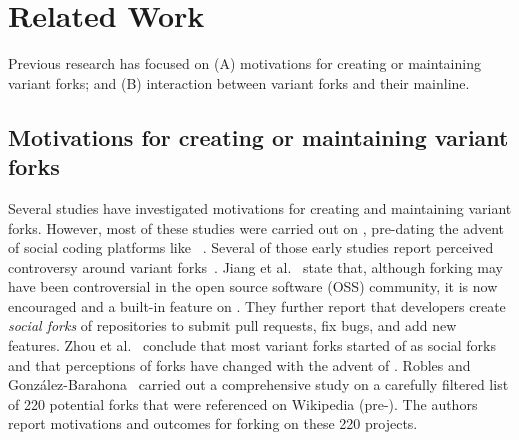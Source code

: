 
\section{Related Work}
\label{sec:background}
Previous research has focused on (A) motivations for creating or maintaining variant forks; and (B) interaction between variant forks and their mainline.%



\subsection{Motivations for creating or maintaining variant forks}
\label{sec:motivations}

Several studies have investigated motivations for creating and maintaining variant forks. However, most of these studies were carried out on \sourceforge, pre-dating the advent of social coding platforms like \gh~\cite{Linus:2012Perspectives,Gregorio:2012,Viseur:2012Forks,Linus:2013CodeForking,Laurent:2008,Linus:2011ToFork}. Several of those early studies report
perceived controversy
around variant forks~\cite{Chua:Forking:2017,Dixion:2009Forks,Ernst:2010,Linus:2011ToFork,Linus:2014Hackers,Raymond:Cathedral:2001,pete}.
Jiang et al.~\cite{Lo:2017} state that, although forking may have been controversial in the open source software (OSS) community, it is now encouraged and a built-in feature on \gh. They further report that developers create \emph{social forks} of repositories to submit pull requests, fix bugs, and add new features. Zhou et al.~\cite{Zhou:2020} conclude that most variant forks started of as social forks
and that perceptions of forks have changed with the advent of \gh.
Robles and Gonz{\'a}lez-Barahona~\cite{Gregorio:2012} carried out a comprehensive study on a carefully filtered list of 220 potential forks that were referenced on Wikipedia (pre-\gh).
The authors report motivations and outcomes for forking on these 220 projects.

